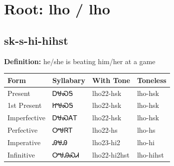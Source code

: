 \documentclass{article}%
\begin{document}
%
\normalsize%
\section*{Root: lho / lho}%
\subsection*{sk-s-hi-hihst}%
\textbf{Definition: }%
he/she is beating him/her at a game%
\\[0.5em]%
\begin{tabular}{|l|l|l|l|}%
\hline%
\textbf{Form}&\textbf{Syllabary}&\textbf{With Tone}&\textbf{Toneless}\\%
\hline%
Present&ᎠᏠᏍᎦ&lho22{-}hsk&lho{-}hsk\\%
1st Present&ᏥᏠᏍᎦ&lho22{-}hsk&lho{-}hsk\\%
Imperfective&ᎠᏠᏍᎪᎢ&lho22{-}hsk&lho{-}hsk\\%
Perfective&ᎤᏠᏒᎢ&lho22{-}hs&lho{-}hs\\%
Imperative&ᎯᏠᎯ&lho23{-}hi2&lho{-}hi\\%
Infinitive&ᎤᏠᎯᏍᏗ&lho22{-}hi2hst&lho{-}hihst\\%
\hline%
\end{tabular}%
\\[1em]%
\end{document}
